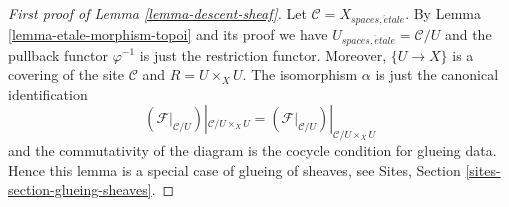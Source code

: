 \documentclass[10pt,a4paper]{amsart}
\theoremstyle{plain}
\theoremstyle{definition}
\theoremstyle{remark}
\numberwithin{equation}{subsection}
\def\etale{{\acute{e}tale}}
\begin{document}
\begin{proof}[First proof of Lemma \ref{lemma-descent-sheaf}]
Let $\mathcal{C} = X_{spaces, \etale}$. By
Lemma \ref{lemma-etale-morphism-topoi}
and its proof we have $U_{spaces, \etale} = \mathcal{C}/U$
and the pullback functor $\varphi^{-1}$ is just the restriction functor.
Moreover, $\{U \to X\}$ is a covering of the site $\mathcal{C}$ and
$R = U \times_X U$. The isomorphism $\alpha$ is just the canonical
identification
$$
\left(\mathcal{F}|_{\mathcal{C}/U}\right)|_{\mathcal{C}/U \times_X U}
=
\left(\mathcal{F}|_{\mathcal{C}/U}\right)|_{\mathcal{C}/U \times_X U}
$$
and the commutativity of the diagram is the cocycle condition for glueing
data. Hence this lemma is a special case of glueing of sheaves, see
Sites, Section \ref{sites-section-glueing-sheaves}.
\end{proof}
\end{document}
